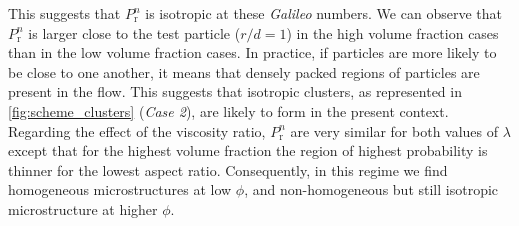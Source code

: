 This suggests that $P_\text{r}^n$ is isotropic at these \textit{Galileo} numbers. We can observe that $P_\text{r}^n$ is larger close to the test particle ($r/d = 1$) in the high volume fraction cases than in the low volume fraction cases.
In practice, if particles are more likely to be close to one another, it means that densely packed regions of particles are present in the flow.
This suggests that isotropic clusters, as represented in \ref{fig:scheme_clusters} (\textit{Case 2}), are likely to form in the present context.%
Regarding the effect of the viscosity ratio, $P_\text{r}^n$ are very similar for both values of $\lambda$ except that for the highest volume fraction the region of highest probability is thinner for the lowest aspect ratio. 
Consequently, in this regime we find homogeneous microstructures at low $\phi$, and non-homogeneous but still isotropic microstructure at higher $\phi$. 

